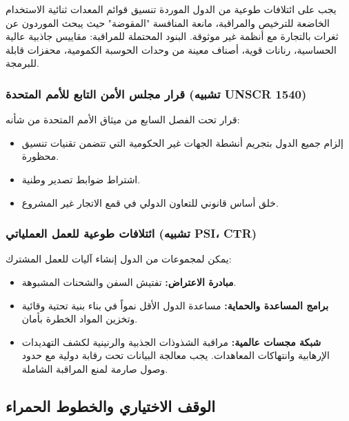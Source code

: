 \documentclass[12pt,a4paper]{article}
\theoremstyle{remark}
\begin{document}
	يجب على ائتلافات طوعية من الدول الموردة تنسيق قوائم المعدات ثنائية الاستخدام الخاضعة للترخيص والمراقبة، مانعة المنافسة "المقوضة" حيث يبحث الموردون عن ثغرات بالتجارة مع أنظمة غير موثوقة. البنود المحتملة للمراقبة: مقاييس جاذبية عالية الحساسية، رنانات قوية، أصناف معينة من وحدات الحوسبة الكمومية، محفزات قابلة للبرمجة.
	
	\subsubsection{قرار مجلس الأمن التابع للأمم المتحدة (تشبيه UNSCR 1540)}
	
	قرار تحت الفصل السابع من ميثاق الأمم المتحدة من شأنه:
	\begin{itemize}
		\item إلزام جميع الدول بتجريم أنشطة الجهات غير الحكومية التي تتضمن تقنيات تنسيق محظورة.
		\item اشتراط ضوابط تصدير وطنية.
		\item خلق أساس قانوني للتعاون الدولي في قمع الاتجار غير المشروع.
	\end{itemize}
	
	\subsubsection{ائتلافات طوعية للعمل العملياتي (تشبيه PSI، CTR)}
	
	يمكن لمجموعات من الدول إنشاء آليات للعمل المشترك:
	\begin{itemize}
		\item \textbf{مبادرة الاعتراض:} تفتيش السفن والشحنات المشبوهة.
		\item \textbf{برامج المساعدة والحماية:} مساعدة الدول الأقل نمواً في بناء بنية تحتية وقائية وتخزين المواد الخطرة بأمان.
		\item \textbf{شبكة مجسات عالمية:} مراقبة الشذوذات الجذبية والرنينية لكشف التهديدات الإرهابية وانتهاكات المعاهدات. يجب معالجة البيانات تحت رقابة دولية مع حدود وصول صارمة لمنع المراقبة الشاملة.
	\end{itemize}
	
	\subsection{الوقف الاختياري والخطوط الحمراء}
	\label{subsec:redlines}
	
\end{document}
